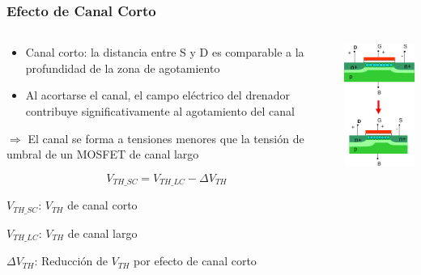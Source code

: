 \documentclass[t,aspectratio=169,10pt]{beamer}
\begin{document}
\begin{frame}
\frametitle{Efecto de Canal Corto}

\begin{columns}

	\begin{column}{0.5\textwidth}
 
		\begin{itemize}
			\item Canal corto: la distancia entre S y D es comparable a la profundidad de la zona de agotamiento
			\item Al acortarse el canal, el campo eléctrico del drenador contribuye significativamente al agotamiento del canal
		\end{itemize}
		
		$\Rightarrow$ El canal se forma a tensiones menores que la tensión de umbral de un MOSFET de canal largo
		
		\[ V_{TH\_SC} = V_{TH\_LC} - \Delta V_{TH} \]
		
		\vspace{4mm}
		$V_{TH\_SC}$: $V_{TH}$ de canal corto
		
		$V_{TH\_LC}$: $V_{TH}$ de canal largo
		
		$\Delta V_{TH}$: Reducción de $V_{TH}$ por efecto de canal corto
  
	\end{column}
 
	\begin{column}{0.5\textwidth}
 
		\centering
		\includegraphics[width=4cm]{short-channel}
  
	\end{column}
 
\end{columns}

\end{frame}
\end{document}
